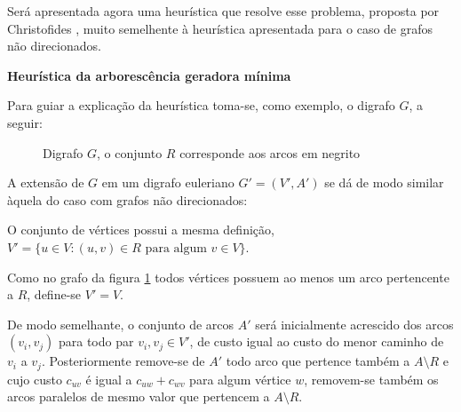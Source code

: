 \documentclass[12pt, a4paper]{article}
\begin{document}
        Será apresentada agora uma heurística que resolve esse problema, proposta por Christofides \cite{christofides-86}, muito semelhente à heurística apresentada para o caso de grafos não direcionados.

        \textbf{Heurística da arborescência geradora mínima}

        Para guiar a explicação da heurística toma-se, como exemplo, o digrafo $G$, a seguir:
   

        \begin{figure}[H]
            \centering
            \caption{Digrafo $G$, o conjunto $R$ corresponde aos arcos em negrito}
            \label{pcr-digraph}
        \end{figure}

        A extensão de $G$ em um digrafo euleriano $G' = (V', A')$ se dá de modo similar àquela do caso com grafos não direcionados:

        O conjunto de vértices possui a mesma definição, $V' = \{u \in V : (u, v) \in R \text{ para algum } v \in V\}$. 

        Como no grafo da figura \ref{pcr-digraph} todos vértices possuem ao menos um arco pertencente a $R$, define-se $V' = V$.

        De modo semelhante, o conjunto de arcos $A'$ será inicialmente acrescido dos arcos $(v_i, v_j)$ para todo par $v_i, v_j \in V'$, de custo igual ao custo do menor caminho de $v_i$ a $v_j$.
        Posteriormente remove-se de $A'$ todo arco que pertence também a $A \setminus R$ e cujo custo $c_{uv}$ é igual a $c_{uw} + c_{wv}$ para algum vértice $w$, removem-se também os arcos paralelos de mesmo valor que pertencem a $A \setminus R$.
\end{document}
